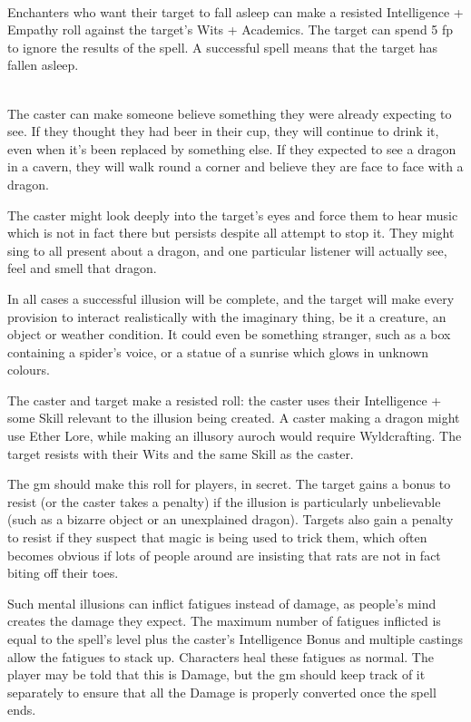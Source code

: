 \begin{multicols}{2}
\spelllevel

\\
Enchanters who want their target to fall asleep can make a resisted Intelligence + Empathy roll against the target's Wits + Academics.
The target can spend 5 \gls{fp} to ignore the results of the spell. A successful spell means that the target has fallen asleep.

\\
The caster can make someone believe something they were already expecting to see.
If they thought they had beer in their cup, they will continue to drink it, even when it's been replaced by something else.
If they expected to see a dragon in a cavern, they will walk round a corner and believe they are face to face with a dragon.

The caster might look deeply into the target's eyes and force them to hear music which is not in fact there but persists despite all attempt to stop it. They might sing to all present about a dragon, and one particular listener will actually see, feel and smell that dragon.

In all cases a successful illusion will be complete, and the target will make every provision to interact realistically with the imaginary thing, be it a creature, an object or weather condition. It could even be something stranger, such as a box containing a spider's voice, or a statue of a sunrise which glows in unknown colours.

The caster and target make a resisted roll: the caster uses their Intelligence + some Skill relevant to the illusion being created.
A caster making a dragon might use Ether Lore, while making an illusory auroch would require Wyldcrafting.
The target resists with their Wits and the same Skill as the caster.

The \gls{gm} should make this roll for players, in secret. The target gains a bonus to resist (or the caster takes a penalty) if the illusion is particularly unbelievable (such as a bizarre object or an unexplained dragon). Targets also gain a penalty to resist if they suspect that magic is being used to trick them, which often becomes obvious if lots of people around are insisting that rats are not in fact biting off their toes.

Such mental illusions can inflict \glspl{fatigue} instead of damage, as people's mind creates the damage they expect.
The maximum number of \glspl{fatigue} inflicted is equal to the spell's level plus the caster's Intelligence Bonus and multiple castings allow the \glspl{fatigue} to stack up.
Characters heal these \glspl{fatigue} as normal.
The player may be told that this is Damage, but the \gls{gm} should keep track of it separately to ensure that all the Damage is properly converted once the spell ends.


\end{multicols}
